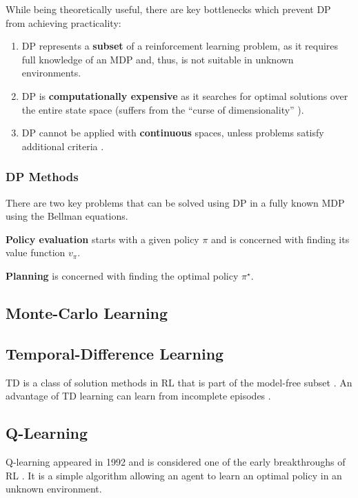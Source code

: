 While being theoretically useful, there are key bottlenecks which prevent DP from achieving practicality:

\begin{enumerate}
    \item DP represents a \textbf{subset} of a reinforcement learning problem, as it requires full knowledge of an MDP and, thus, is not suitable in unknown environments.
    \item DP is \textbf{computationally expensive} as it searches for optimal solutions over the entire state space (suffers from the ``curse of dimensionality'' \cite{rlai}).
    \item DP cannot be applied with \textbf{continuous} spaces, unless problems satisfy additional criteria \cite{rlai}.
\end{enumerate}

\subsubsection{DP Methods}
There are two key problems that can be solved using DP in a fully known MDP using the Bellman equations.

\textbf{Policy evaluation} starts with a given policy \(\pi\) and is concerned with finding its value function \(v_{\pi}\).

\textbf{Planning} is concerned with finding the optimal policy \(\pi^{\star}\).

\subsection{Monte-Carlo Learning} \label{rl:mc}

\subsection{Temporal-Difference Learning} \label{rl:td}
TD is a class of solution methods in RL that is part of the model-free subset \cite{rlai}.
An advantage of TD learning can learn from incomplete episodes \cite{long-peak-rl}.

\subsection{Q-Learning} \label{rl:q-learning}
Q-learning \cite{Watkins1992} appeared in 1992 and is considered one of the early breakthroughs of RL \cite{rlai}.
It is a simple algorithm allowing an agent to learn an optimal policy in an unknown environment.